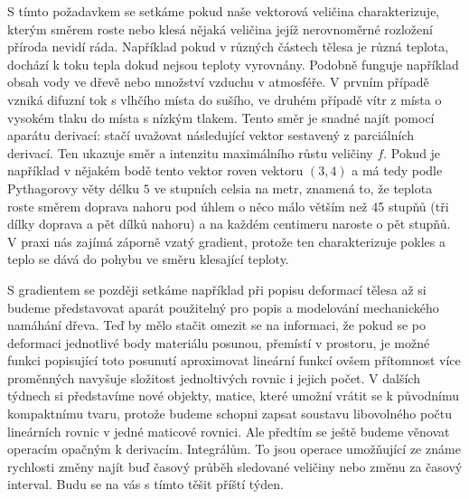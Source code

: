 \documentclass[12pt]{article}
\begin{document}
S tímto požadavkem se setkáme pokud naše vektorová veličina charakterizuje, kterým směrem roste nebo klesá nějaká veličina jejíž nerovnoměrné rozložení příroda nevidí ráda. Například pokud v různých částech tělesa je různá teplota, dochází k toku tepla dokud nejsou teploty vyrovnány. Podobně funguje například obsah vody ve dřevě nebo množství vzduchu v atmosféře. V prvním případě vzniká difuzní tok s vlhčího místa do sušího, ve druhém případě vítr z místa o vysokém tlaku do místa s nízkým tlakem. Tento směr je snadné najít pomocí aparátu derivací: stačí uvažovat následující vektor sestavený z parciálních derivací. Ten ukazuje směr a intenzitu maximálního růstu veličiny $f$. Pokud je například v nějakém bodě tento vektor roven vektoru $(3,4)$ a má tedy podle Pythagorovy věty délku $5$ ve stupních celsia na metr, znamená to, že teplota roste směrem doprava nahoru pod úhlem o něco málo větším než 45 stupňů (tři dílky doprava a pět dílků nahoru) a na každém centimeru naroste o pět stupňů. V praxi nás zajímá záporně vzatý gradient, protože ten charakterizuje pokles a teplo se dává do pohybu ve směru klesající teploty. 

S gradientem se později setkáme například při popisu deformací tělesa až si budeme představovat aparát použitelný pro popis a modelování mechanického namáhání dřeva. Teď by mělo stačit omezit se na informaci, že pokud se po deformaci jednotlivé body materiálu posunou, přemístí v prostoru, je možné funkci popisující toto posunutí aproximovat lineární funkcí ovšem přítomnost více proměnných navyšuje složitost jednoltivých rovnic i jejich počet. V dalších týdnech si představíme nové objekty, matice, které umožní vrátit se k původnímu kompaktnímu tvaru, protože budeme schopni zapsat soustavu libovolného počtu lineárních rovnic v jedné maticové rovnici. Ale předtím se ještě budeme věnovat operacím opačným k derivacím. Integrálům. To jsou operace umožňující ze známe rychlosti změny najít buď časový průběh sledované veličiny nebo změnu za časový interval. Budu se na vás s tímto těšit příští týden. 
\end{document}
